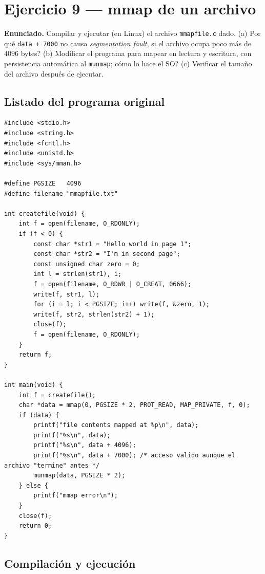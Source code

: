 \documentclass[11pt,a4paper]{article}
\begin{document}
\section{Ejercicio 9 --- mmap de un archivo}

\textbf{Enunciado.} Compilar y ejecutar (en Linux) el archivo
\texttt{mmapfile.c} dado. (a) \textquestiondown{}Por qué \texttt{data + 7000} no causa
\emph{segmentation fault}, si el archivo ocupa poco más de $4096$
bytes? (b) Modificar el programa para mapear en lectura y escritura,
con persistencia automática al \texttt{munmap}; \textquestiondown{}cómo lo hace el SO?
(c) Verificar el tamaño del archivo después de ejecutar.

\subsection{Listado del programa original}

\begin{lstlisting}[style=cstyle]
#include <stdio.h>
#include <string.h>
#include <fcntl.h>
#include <unistd.h>
#include <sys/mman.h>

#define PGSIZE   4096
#define filename "mmapfile.txt"

int createfile(void) {
    int f = open(filename, O_RDONLY);
    if (f < 0) {
        const char *str1 = "Hello world in page 1";
        const char *str2 = "I'm in second page";
        const unsigned char zero = 0;
        int l = strlen(str1), i;
        f = open(filename, O_RDWR | O_CREAT, 0666);
        write(f, str1, l);
        for (i = l; i < PGSIZE; i++) write(f, &zero, 1);
        write(f, str2, strlen(str2) + 1);
        close(f);
        f = open(filename, O_RDONLY);
    }
    return f;
}

int main(void) {
    int f = createfile();
    char *data = mmap(0, PGSIZE * 2, PROT_READ, MAP_PRIVATE, f, 0);
    if (data) {
        printf("file contents mapped at %p\n", data);
        printf("%s\n", data);
        printf("%s\n", data + 4096);
        printf("%s\n", data + 7000); /* acceso valido aunque el archivo "termine" antes */
        munmap(data, PGSIZE * 2);
    } else {
        printf("mmap error\n");
    }
    close(f);
    return 0;
}
\end{lstlisting}

\subsection{Compilación y ejecución}
\end{document}
